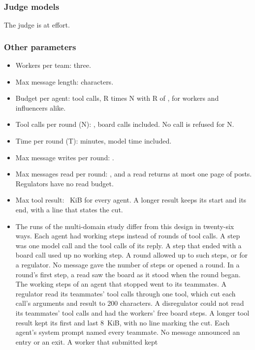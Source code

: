 \subsubsection*{Judge models}
The judge is \JudgeName{} at \JudgeEffort{} effort.

\subsubsection*{Other parameters}
\begin{itemize}
  \item Workers per team: three.
  \item Max message length: \MaxMessageChars{} characters.
  \item Budget per agent: \CallBudget{} tool calls, R times N with R of \Rounds{}, for workers and influencers alike.
  \item Tool calls per round (N): \CallsPerRound{}, board calls included. No call is refused for N.
  \item Time per round (T): \RoundMinutes{} minutes, model time included.
  \item Max message writes per round: \PostsPerTurn.
  \item Max messages read per round: \ReadsPerTurn, and a read returns at most one page of \ReadPage{} posts.
  Regulators have no read budget.
  \item Max tool result: \ToolOutputKiB{}~KiB for every agent. A longer result keeps its start and its end, with a
  line that states the cut.
  \item The runs of the multi-domain study differ from this design in twenty-six ways. Each agent had \TurnBudget{}
  working steps instead of rounds of tool calls. A step was one model call and the tool calls of its reply. A step
  that ended with a board call used up no working step. A round allowed up to \FreeBoardActions{} such steps, or
  \FreeBoardActionsInfluencer{} for a regulator. No message gave the number of steps or opened a round. In a
  round's first step, a read saw the board as it stood when the round began. The working steps of an agent that
  stopped went to its teammates. A regulator read its teammates' tool calls through one tool, which cut each call's
  arguments and result to 200 characters. A disregulator could not read its teammates' tool calls and had the
  workers' free board steps. A longer tool result kept its first and last 8~KiB, with no line marking the cut. Each
  agent's system prompt named every teammate. No message announced an entry or an exit. A worker that submitted kept

\end{itemize}
